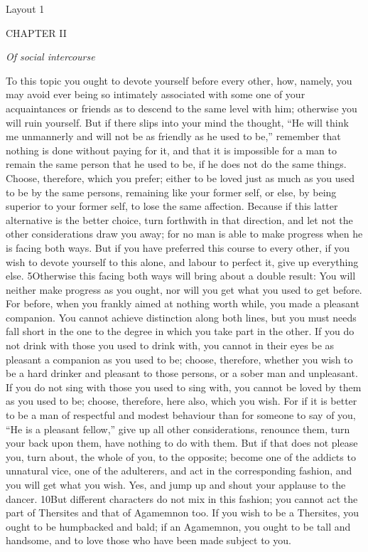 
Layout 1

CHAPTER II

\emph{Of social intercourse}

To this topic you ought to devote yourself before every other, how, namely, you may avoid ever being so intimately associated with some one of your acquaintances or friends as to descend to the same level with him; otherwise you will ruin yourself. But if there slips into your mind the thought, ``He will think me unmannerly and will not be as friendly as he used to be,'' remember that nothing is done without paying for it, and that it is impossible for a man to remain the same person that he used to be, if he does not do the same things. Choose, therefore, which you prefer; either to be loved just as much as you used to be by the same persons, remaining like your former self, or else, by being superior to your former self, to lose the same affection. Because if this latter alternative is the better choice, turn forthwith in that direction, and let not the other considerations draw you away; for no man is able to make progress when he is facing both ways. But if you have preferred this course to every other, if you wish to devote yourself to this alone, and labour to perfect it, give up everything else. 5Otherwise this facing both ways will bring about a double result: You will neither make progress as you ought, nor will you get what you used to get before. For before, when you frankly aimed at nothing worth while, you made a pleasant companion. You cannot achieve distinction along both lines, but you must needs fall short in the one to the degree in which you take part in the other. If you do not drink with those you used to drink with, you cannot in their eyes be as pleasant a companion as you used to be; choose, therefore, whether you wish to be a hard drinker and pleasant to those persons, or a sober man and unpleasant. If you do not sing with those you used to sing with, you cannot be loved by them as you used to be; choose, therefore, here also, which you wish. For if it is better to be a man of respectful and modest behaviour than for someone to say of you, ``He is a pleasant fellow,'' give up all other considerations, renounce them, turn your back upon them, have nothing to do with them. But if that does not please you, turn about, the whole of you, to the opposite; become one of the addicts to unnatural vice, one of the adulterers, and act in the corresponding fashion, and you will get what you wish. Yes, and jump up and shout your applause to the dancer. 10But different characters do not mix in this fashion; you cannot act the part of Thersites and that of Agamemnon too. If you wish to be a Thersites, you ought to be humpbacked and bald; if an Agamemnon, you ought to be tall and handsome, and to love those who have been made subject to you.

